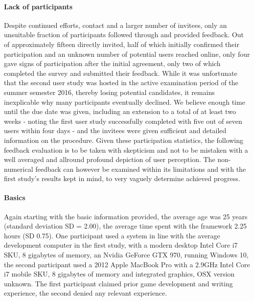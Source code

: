 \paragraph{Lack of participants} Despite continued efforts, contact and a larger number of invitees, only an unsuitable fraction of participants followed through and provided feedback. Out of approximately fifteen directly invited, half of which initially confirmed their participation and an unknown number of potential users reached online, only four gave signs of participation after the initial agreement, only two of which completed the survey and submitted their feedback. 
While it was unfortunate that the second user study was hosted in the active examination period of the summer semester 2016, thereby losing potential candidates, it remains inexplicable why many participants eventually declined. We believe enough time until the due date was given, including an extension to a total of at least two weeks - noting the first user study successfully completed with five out of seven users within four days - and the invitees were given sufficient and detailed information on the procedure. 
Given these participation statistics, the following feedback evaluation is to be taken with skepticism and not to be mistaken with a well averaged and allround profound depiction of user perception. The non-numerical feedback can however be examined within its limitations and with the first study's results kept in mind, to very vaguely determine achieved progress.
\paragraph{Basics} Again starting with the basic information provided, the average age was 25 years (standard deviation SD = 2.00), the average time spent with the framework 2.25 hours (SD 0.75). 
One participant used a system in line with the average development computer in the first study, with a modern desktop Intel Core i7 SKU, 8 gigabytes of memory, an Nvidia GeForce GTX 970, running Windows 10, the second participant used a 2012 Apple MacBook Pro with a 2.9GHz Intel Core i7 mobile SKU, 8 gigabytes of memory and integrated graphics, OSX version unknown.
The first participant claimed prior game development and writing experience, the second denied any relevant experience.
